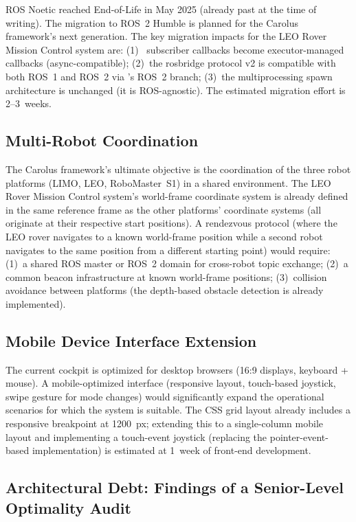 ROS Noetic reached End-of-Life in May 2025 (already past at the time of writing). The migration to ROS~2 Humble is planned for the Carolus framework's next generation. The key migration impacts for the LEO Rover Mission Control system are: (1)~ subscriber callbacks become  executor-managed callbacks (async-compatible); (2)~the rosbridge protocol v2 is compatible with both ROS~1 and ROS~2 via 's ROS~2 branch; (3)~the multiprocessing spawn architecture is unchanged (it is ROS-agnostic). The estimated migration effort is 2--3~weeks.

\subsection{Multi-Robot Coordination}

The Carolus framework's ultimate objective is the coordination of the three robot platforms (LIMO, LEO, RoboMaster~S1) in a shared environment. The LEO Rover Mission Control system's world-frame coordinate system is already defined in the same reference frame as the other platforms' coordinate systems (all originate at their respective start positions). A rendezvous protocol (where the LEO rover navigates to a known world-frame position while a second robot navigates to the same position from a different starting point) would require: (1)~a shared ROS master or ROS~2 domain for cross-robot topic exchange; (2)~a common beacon infrastructure at known world-frame positions; (3)~collision avoidance between platforms (the depth-based obstacle detection is already implemented).

\subsection{Mobile Device Interface Extension}

The current cockpit is optimized for desktop browsers (16:9 displays, keyboard + mouse). A mobile-optimized interface (responsive layout, touch-based joystick, swipe gesture for mode changes) would significantly expand the operational scenarios for which the system is suitable. The CSS grid layout already includes a responsive breakpoint at 1200~px; extending this to a single-column mobile layout and implementing a touch-event joystick (replacing the pointer-event-based implementation) is estimated at 1~week of front-end development.

\subsection{Architectural Debt: Findings of a Senior-Level Optimality Audit}
\label{ap:roadmap-audit}

